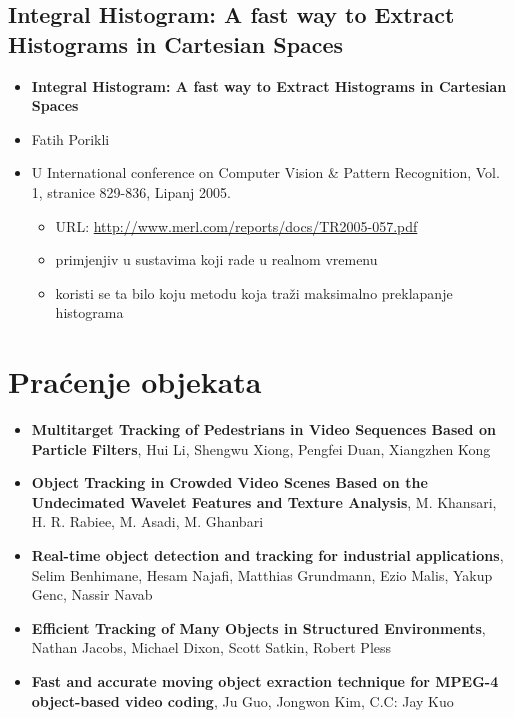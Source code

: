 \documentclass[times, utf8, seminar, numeric]{fer}
\begin{document}
\subsection{Integral Histogram: A fast way to Extract Histograms in Cartesian Spaces}
\begin{itemize}
\item \textbf{Integral Histogram: A fast way to Extract Histograms in Cartesian Spaces}
\item Fatih Porikli
\item U International conference on Computer Vision \& Pattern Recognition, Vol. 1, stranice 829-836, Lipanj 2005. 
	\begin{itemize}
		\item URL: \url{http://www.merl.com/reports/docs/TR2005-057.pdf}
		\item primjenjiv u sustavima koji rade u realnom vremenu
		\item koristi se ta bilo koju metodu koja traži maksimalno preklapanje histograma
	\end{itemize}
\end{itemize}

\section{Praćenje objekata}

\begin{itemize}

\item \textbf{Multitarget Tracking of Pedestrians in Video Sequences Based on Particle Filters}, Hui Li, Shengwu Xiong, Pengfei Duan, Xiangzhen Kong

\item \textbf{Object Tracking in Crowded Video Scenes Based on the Undecimated Wavelet Features and Texture Analysis}, M. Khansari, H. R. Rabiee, M. Asadi, M. Ghanbari

\item \textbf{Real-time object detection and tracking for industrial applications}, Selim Benhimane, Hesam Najafi, Matthias Grundmann, Ezio Malis, Yakup Genc, Nassir Navab

\item \textbf{Efficient Tracking of Many Objects in Structured Environments}, Nathan Jacobs, Michael Dixon, Scott Satkin, Robert Pless

\item \textbf{Fast and accurate moving object exraction technique for MPEG-4 object-based video coding}, Ju Guo, Jongwon Kim, C.C: Jay Kuo

\end{itemize}
\end{document}
